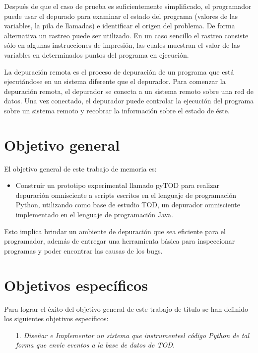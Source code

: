 \documentclass[12pt,legalpaper]{report}
\begin{document}
Después de que el caso de prueba es suficientemente simplificado, el programador puede usar el depurado para examinar el estado del programa (valores de las variables, la pila de llamadas) e identificar el origen del problema.  De forma alternativa un rastreo puede ser utilizado.  En un caso sencillo el rastreo consiste sólo en algunas instrucciones de impresión, las cuales muestran el valor de las variables en determinados puntos del programa en ejecución.

La depuración remota es el proceso de depuración de un programa que está ejecutándose en un sistema diferente que el depurador.  Para comenzar la depuración remota, el depurador se conecta a un sistema remoto sobre una red de datos.  Una vez conectado, el depurador puede controlar la ejecución del programa  sobre un sistema remoto y recobrar la información sobre el estado de éste.

	\section{Objetivo general}

El objetivo general de este trabajo de memoria es:
\begin{itemize}
\item Construir un prototipo experimental llamado pyTOD para realizar depuración omnisciente a scripts escritos en el lenguaje de programación Python, utilizando como base de estudio TOD, un depurador omnisciente implementado en el lenguaje de programación Java.
\end{itemize}

    Esto implica brindar un ambiente de depuración que sea eficiente para el programador, además de entregar una herramienta básica para inspeccionar programas y poder encontrar las causas de los bugs.

	\section{Objetivos específicos}

Para lograr el éxito del objetivo general de este trabajo de título se han definido los siguientes objetivos específicos:

\begin{itemize}
\item[1.] \textit{Diseñar e Implementar un sistema que instrumente\footnotemark[1] el código Python de tal forma que envíe eventos a la base de datos de TOD.}
\end{itemize}
\end{document}
